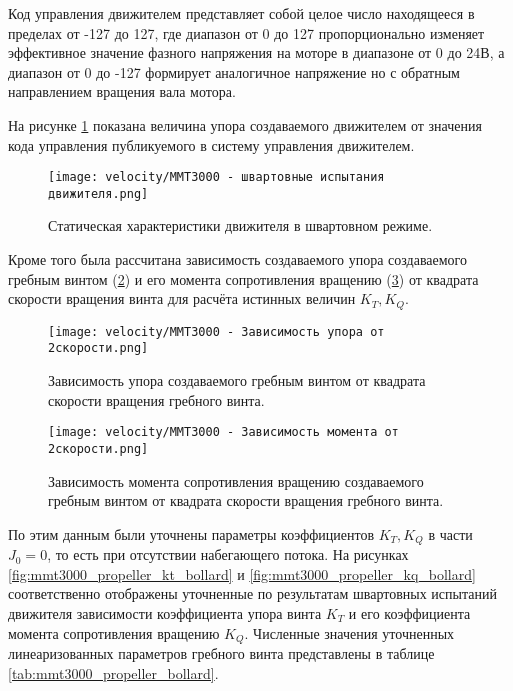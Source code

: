 Код управления движителем представляет собой целое число находящееся в пределах от -127 до 127, где диапазон от 0 до 127 пропорционально изменяет эффективное значение фазного напряжения на моторе в диапазоне от 0 до 24В, а диапазон от 0 до -127 формирует аналогичное напряжение но с обратным направлением вращения вала мотора.

На рисунке \ref{fig:mmt3000_bollardpul} показана величина упора создаваемого движителем от значения кода управления публикуемого в систему управления движителем.
\begin{figure}[ht]
    \centering
    \texttt{[image: velocity/MMT3000 - швартовные испытания движителя.png]}
    \caption{Статическая характеристики движителя в швартовном режиме.}
    \label{fig:mmt3000_bollardpul}
\end{figure}

Кроме того была рассчитана зависимость создаваемого упора создаваемого гребным винтом (\ref{fig:mmt3000_thrust_rotation2}) и его момента сопротивления вращению (\ref{fig:mmt3000_torque_rotation2}) от квадрата скорости вращения винта для расчёта истинных величин $K_T,K_Q$.

\begin{figure}[ht]
    \centering
    \texttt{[image: velocity/MMT3000 - Зависимость упора от 2скорости.png]}
    \caption{Зависимость упора создаваемого гребным винтом от квадрата скорости вращения гребного винта.}
    \label{fig:mmt3000_thrust_rotation2}
\end{figure}

\begin{figure}[ht]
    \centering
    \texttt{[image: velocity/MMT3000 - Зависимость момента от 2скорости.png]}
    \caption{Зависимость момента сопротивления вращению создаваемого гребным винтом от квадрата скорости вращения гребного винта.}
    \label{fig:mmt3000_torque_rotation2}
\end{figure}

По этим данным были уточнены параметры коэффициентов $K_T, K_Q$ в части $J_0 = 0$, то есть при отсутствии набегающего потока.
На рисунках \ref{fig:mmt3000_propeller_kt_bollard} и \ref{fig:mmt3000_propeller_kq_bollard} соответственно отображены уточненные по результатам швартовных испытаний движителя зависимости коэффициента упора винта $K_T$ и его коэффициента момента сопротивления вращению $K_Q$.
Численные значения уточненных линеаризованных параметров гребного винта представлены в таблице \ref{tab:mmt3000_propeller_bollard}.

